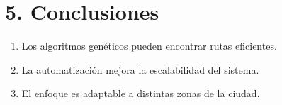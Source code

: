 \section*{5. Conclusiones}
\begin{enumerate}
  \item Los algoritmos genéticos pueden encontrar rutas eficientes.
  \item La automatización mejora la escalabilidad del sistema.
  \item El enfoque es adaptable a distintas zonas de la ciudad.
\end{enumerate}
